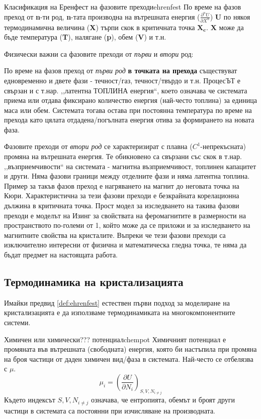 \begin{definition}{Класификация на Еренфест на фазовите преходи}{ehrenfest}
	По време на фазов преход от \textbf{n}-ти род, \textbf{n}-тата производна на вътрешната енергия ($\frac{\partial^n U}{\partial X^n}$) \textbf{U} по някоя термодинамична величина (\textbf{X}) търпи скок в критичната точка $\boldsymbol{X_c}$. \textbf{X} може да бъде температура (\textbf{T}), налягане (\textbf{p}), обем (\textbf{V}) и т.н.
\end{definition}

\noindent Физически важни са фазовите преходи от \textit{първи} и \textit{втори} род:

По време на фазов преход от \textit{първи род} \textbf{в точката на прехода} съществуват едновременно и двете фази - течност/газ, течност/твърдо и т.н. ПроцесЪТ е свързан и с т.нар. ,,латентна ТОПЛИНА енергия``, което означава че системата приема или отдава фиксирано количество енергия (най-често топлина) за единица маса или обем. Системата тогава остава при постоянна температура по време на прехода като цялата отдадена/погълната енергия отива за формирането на новата фаза.

Фазовите преходи от \textit{втори род} се характеризират с плавна ($C^1$-непрекъсната) промяна на вътрешната енергия. Те обикновено са свързани със скок в т.нар. ,,възприемчивости`` на системата - магнитна възприемчивост, топлинен капацитет и други. Няма фазови граници между отделните фази и няма латентна топлина. Пример за такъв фазов преход е нагряването на магнит до неговата точка на Кюри. Характеристична за тези фазови преходи е безкрайната корелационна дължина в критичната точка. Прост модел за изследването на такива фазови преходи е моделът на Изинг за свойствата на феромагнитите в размерности на пространството по-големи от 1, който може да се приложи и за изследването на магнитните свойства на кристалите. Въпреки че тези фазови преходи са изключително интересни от физична и математическа гледна точка, те няма да бъдат предмет на настоящата работа.

\subsection{Термодинамика на кристализацията}
\label{sub:thermodynamics}
Имайки предвид \autoref{def:ehrenfest} естествен първи подход за моделиране на кристализацията е да използваме термодинамиката на многокомпонентните системи.

\begin{definition}{Химичен или химически??? потенциал}{chempot}
    Химичният потенциал е промяната във вътрешната (свободната) енергия, която би настъпила при промяна на броя частици от даден химичен вид/фаза в системата. Най-често се отбелязва с $\mu$.
	\begin{equation}
		\label{eq:chempot}
		\mu_i = \left(\frac{\partial U}{\partial N_i}\right)_{S, V, N_{i \ne j}}
	\end{equation}
	Където индексът $S, V, N_{i \ne j}$ означава, че ентропията, обемът и броят други частици в системата са постоянни при изчисляване на производната.
\end{definition}

